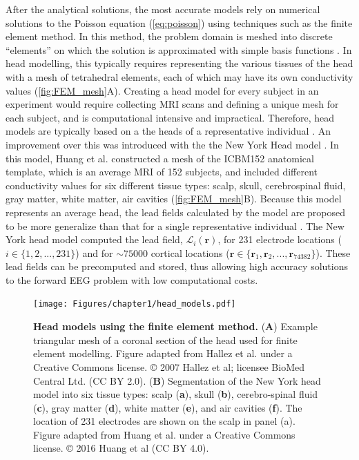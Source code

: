 After the analytical solutions, the most accurate models rely on numerical solutions to the Poisson equation (\ref{eq:poisson}) using techniques such as the finite element method. In this method, the problem domain is meshed into discrete ``elements'' on which the solution is approximated with simple basis functions \cite{Liu2014}. In head modelling, this typically requires representing the various tissues of the head with a mesh of tetrahedral elements, each of which may have its own conductivity values \cite{Hallez2007} (\autoref{fig:FEM_mesh}A). Creating a head model for every subject in an experiment would require collecting MRI scans and defining a unique mesh for each subject, and is computational intensive and impractical. Therefore, head models are typically based on a the heads of a representative individual \cite{Holmes1998}. An improvement over this was introduced with the the New York Head model \cite{Huang2016}. In this model, Huang et al. constructed a mesh of the ICBM152 anatomical template, which is an average MRI of 152 subjects, and included different conductivity values for six different tissue types: scalp, skull, cerebrospinal fluid, gray matter, white matter, air cavities (\autoref{fig:FEM_mesh}B). Because this model represents an average head, the lead fields calculated by the model are proposed to be more generalize than that for a single representative individual \cite{Huang2016}. The New York head model computed the lead field, $\mathcal{L}_i(\bm{r})$, for 231 electrode locations ($i\in\{1,2,...,231\}$) and for  ${\sim}75000$ cortical locations ($\bm{r}\in\{ \bm{r}_1, \bm{r}_2, ..., \bm{r}_{74382} \}$). These lead fields can be precomputed and stored, thus allowing high accuracy solutions to the forward EEG problem with low computational costs.

\begin{figure}[t!]
    \centering
    \texttt{[image: Figures/chapter1/head\_models.pdf]}
    
    \caption{\textbf{Head models using the finite element method.} 
    (\textbf{A}) Example triangular mesh of a coronal section of the head used for finite element modelling. Figure adapted from Hallez et al. \cite{Hallez2007} under a Creative Commons license. © 2007 Hallez et al; licensee BioMed Central Ltd. (CC BY 2.0).
    (\textbf{B}) Segmentation of the New York head model into six tissue types: scalp (\textbf{a}), skull (\textbf{b}), cerebro-spinal fluid (\textbf{c}), gray matter (\textbf{d}), white matter (\textbf{e}), and air cavities (\textbf{f}). The location of 231 electrodes are shown on the scalp in panel (a). Figure adapted from Huang et al. \cite{Huang2016} under a Creative Commons license. © 2016 Huang et al (CC BY 4.0).
    } 
    \label{fig:FEM_mesh}
\end{figure}



